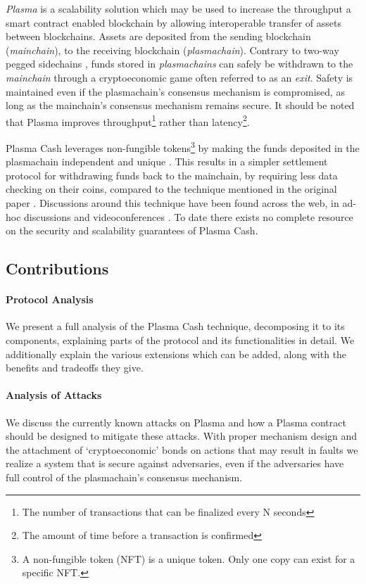

\textit{Plasma} is a scalability solution which may be used to increase the 
throughput a smart contract enabled blockchain by allowing 
interoperable transfer of assets between blockchains. Assets are deposited 
from the sending blockchain (\textit{mainchain}), to
the receiving blockchain (\textit{plasmachain}).
Contrary to two-way pegged sidechains \cite{sidechains}, funds stored in
\textit{plasmachains} can safely be withdrawn to the \textit{mainchain} through a
cryptoeconomic game often referred to as an \textit{exit}. Safety is maintained even if the
plasmachain's consensus mechanism is compromised, as long as the
mainchain's consensus mechanism remains secure. It should be noted that
Plasma improves throughput\footnote{The number of transactions that can be
finalized every N seconds} rather than latency\footnote{The amount of time
before a transaction is confirmed}.

Plasma Cash leverages non-fungible tokens\footnote{A non-fungible token (NFT) is a unique token. Only one copy can exist for a specific NFT.} by making the funds deposited in the plasmachain independent and unique \cite{plasma_cash}. This results in a simpler settlement protocol for withdrawing funds back to the mainchain, by requiring less data checking on their coins, compared to the technique mentioned in the original paper \cite{plasma}.
Discussions around this technique have been found across  the web, in ad-hoc 
discussions and videoconferences \cite{implementers_call}. To date there exists no 
complete resource on the security and scalability guarantees of Plasma Cash.

\subsection{Contributions} \label{contribs}

\paragraph{Protocol Analysis} We present a full analysis of the Plasma Cash
technique, decomposing it to its components, explaining parts of the
protocol and its functionalities in detail. We additionally explain the various
extensions which can be added, along with the benefits and
tradeoffs they give.

\paragraph{Analysis of Attacks} We discuss the currently known attacks on
Plasma and how a Plasma contract should be designed to mitigate these attacks. 
With proper mechanism design and the attachment of `cryptoeconomic' bonds on
actions that may result in faults we realize a system that is secure
against adversaries, even if the adversaries have full control of the plasmachain's consensus mechanism.

